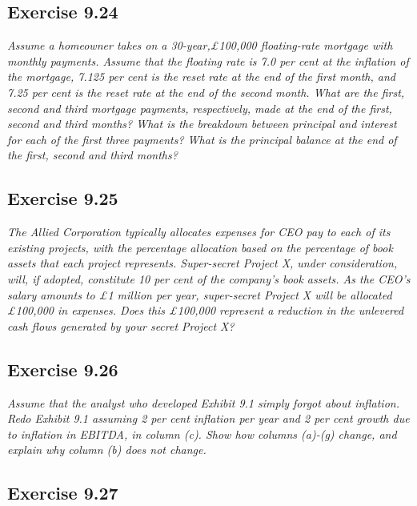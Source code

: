 \documentclass[]{book}
\theoremstyle{definition}
\theoremstyle{definition}
\theoremstyle{remark}
\begin{document}
\subsection{Exercise 9.24}\label{exercise-9.24}

\emph{Assume a homeowner takes on a 30-year,£100,000 floating-rate
mortgage with monthly payments. Assume that the floating rate is 7.0 per
cent at the inflation of the mortgage, 7.125 per cent is the reset rate
at the end of the first month, and 7.25 per cent is the reset rate at
the end of the second month. What are the first, second and third
mortgage payments, respectively, made at the end of the first, second
and third months? What is the breakdown between principal and interest
for each of the first three payments? What is the principal balance at
the end of the first, second and third months?} \citep[p.309]{book}

\subsection{Exercise 9.25}\label{exercise-9.25}

\emph{The Allied Corporation typically allocates expenses for CEO pay to
each of its existing projects, with the percentage allocation based on
the percentage of book assets that each project represents. Super-secret
Project X, under consideration, will, if adopted, constitute 10 per cent
of the company's book assets. As the CEO's salary amounts to £1 million
per year, super-secret Project X will be allocated £100,000 in expenses.
Does this £100,000 represent a reduction in the unlevered cash flows
generated by your secret Project X?} \citep[p.309]{book}

\subsection{Exercise 9.26}\label{exercise-9.26}

\emph{Assume that the analyst who developed Exhibit 9.1 simply forgot
about inflation. Redo Exhibit 9.1 assuming 2 per cent inflation per year
and 2 per cent growth due to inflation in EBITDA, in column (c). Show
how columns (a)-(g) change, and explain why column (b) does not change.}
\citep[p.309]{book}

\subsection{Exercise 9.27}\label{exercise-9.27}
\end{document}

